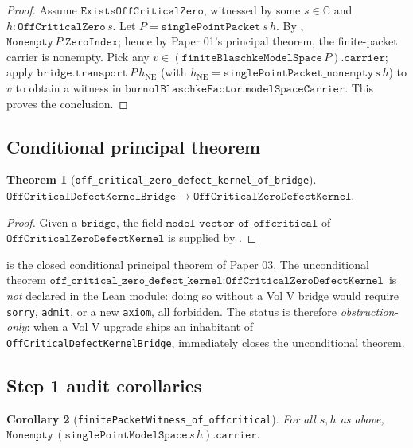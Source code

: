 \documentclass[12pt]{article}
\newtheorem{theorem}{Theorem}[section]
\newtheorem{corollary}[theorem]{Corollary}
\theoremstyle{definition}
\theoremstyle{remark}
\newcommand{\C}{\mathbb{C}}
\begin{document}
\begin{proof}
Assume $\texttt{ExistsOffCriticalZero}$, witnessed by some $s\in\C$ and
$h:\texttt{OffCriticalZero}\,s$. Let
$P = \texttt{singlePointPacket}\,s\,h$. By
, $\texttt{Nonempty}\,P.\texttt{ZeroIndex}$;
hence by Paper 01's principal theorem, the finite-packet carrier is
nonempty. Pick any $v\in (\texttt{finiteBlaschkeModelSpace}\,P).\texttt{carrier}$;
apply $\texttt{bridge.transport}\,P\,h_{\text{NE}}$ (with
$h_{\text{NE}} = \texttt{singlePointPacket\_nonempty}\,s\,h$) to $v$ to
obtain a witness in $\texttt{burnolBlaschkeFactor.modelSpaceCarrier}$.
This proves the conclusion.
\end{proof}

\subsection{Conditional principal theorem}

\begin{theorem}[\texttt{off\_critical\_zero\_defect\_kernel\_of\_bridge}]\label{thm:cond-principal}
\(
\texttt{OffCriticalDefectKernelBridge}
\to
\texttt{OffCriticalZeroDefectKernel}.
\)
\end{theorem}

\begin{proof}
Given a $\texttt{bridge}$, the field
$\texttt{model\_vector\_of\_offcritical}$ of
$\texttt{OffCriticalZeroDefectKernel}$ is supplied by
.
\end{proof}

 is the closed conditional principal theorem of
Paper 03. The unconditional theorem
$\texttt{off\_critical\_zero\_defect\_kernel}:\texttt{OffCriticalZeroDefectKernel}$
is \emph{not} declared in the Lean module: doing so without a Vol V bridge
would require \texttt{sorry}, \texttt{admit}, or a new \texttt{axiom}, all
forbidden. The status is therefore \emph{obstruction-only}: when a Vol V
upgrade ships an inhabitant of \texttt{OffCriticalDefectKernelBridge},
 immediately closes the unconditional theorem.

\subsection{Step 1 audit corollaries}

\begin{corollary}[\texttt{finitePacketWitness\_of\_offcritical}]
\label{cor:fin-witness}
For all $s,h$ as above,
\(
\texttt{Nonempty}\,(\texttt{singlePointModelSpace}\,s\,h).\texttt{carrier}.
\)
\end{corollary}
\end{document}
